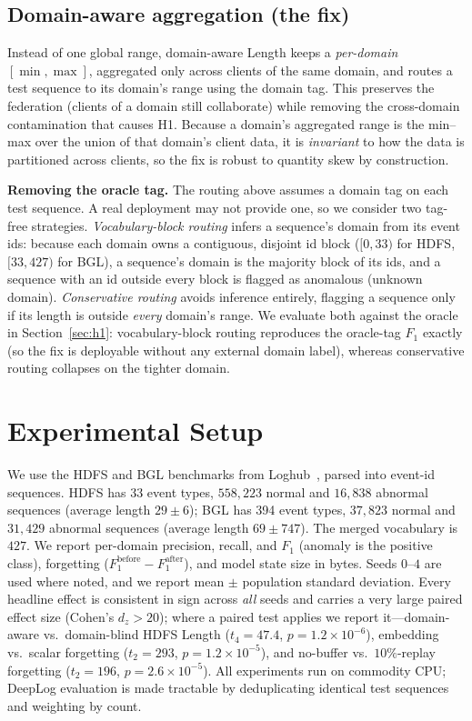 \documentclass[journal]{IEEEtran}
\begin{document}
\subsection{Domain-aware aggregation (the fix)}\label{sec:da}
Instead of one global range, domain-aware Length keeps a \emph{per-domain} $[\min,\max]$, aggregated
only across clients of the same domain, and routes a test sequence to its domain's range using the
domain tag. This preserves the federation (clients of a domain still collaborate) while removing
the cross-domain contamination that causes H1. Because a domain's aggregated range is the min--max
over the union of that domain's client data, it is \emph{invariant} to how the data is partitioned
across clients, so the fix is robust to quantity skew by construction.

\textbf{Removing the oracle tag.} The routing above assumes a domain tag on each test sequence.
A real deployment may not provide one, so we consider two tag-free strategies. \emph{Vocabulary-block
routing} infers a sequence's domain from its event ids: because each domain owns a contiguous, disjoint
id block ($[0,33)$ for HDFS, $[33,427)$ for BGL), a sequence's domain is the majority block of its ids,
and a sequence with an id outside every block is flagged as anomalous (unknown domain). \emph{Conservative
routing} avoids inference entirely, flagging a sequence only if its length is outside \emph{every}
domain's range. We evaluate both against the oracle in Section~\ref{sec:h1}: vocabulary-block routing
reproduces the oracle-tag $F_1$ exactly (so the fix is deployable without any external domain label),
whereas conservative routing collapses on the tighter domain.

\section{Experimental Setup}\label{sec:setup}
We use the HDFS and BGL benchmarks from Loghub~\cite{zhu2023loghub}, parsed into event-id sequences.
HDFS has 33 event types, $558{,}223$ normal and $16{,}838$ abnormal sequences (average length
$29\pm6$); BGL has 394 event types, $37{,}823$ normal and $31{,}429$ abnormal sequences (average
length $69\pm747$). The merged vocabulary is $427$. We report per-domain precision, recall, and
$F_1$ (anomaly is the positive class), forgetting ($F_1^{\text{before}}-F_1^{\text{after}}$), and
model state size in bytes. Seeds $0$--$4$ are used where noted, and we report mean $\pm$ population
standard deviation. Every headline effect is consistent in sign across \emph{all} seeds and carries a
very large paired effect size (Cohen's $d_z>20$); where a paired test applies we report it---domain-aware
vs.\ domain-blind HDFS Length ($t_4{=}47.4$, $p{=}1.2\times10^{-6}$), embedding vs.\ scalar forgetting
($t_2{=}293$, $p{=}1.2\times10^{-5}$), and no-buffer vs.\ $10\%$-replay forgetting ($t_2{=}196$,
$p{=}2.6\times10^{-5}$). All experiments run on commodity CPU; DeepLog evaluation is made tractable by
deduplicating identical test sequences and weighting by count.
\end{document}

